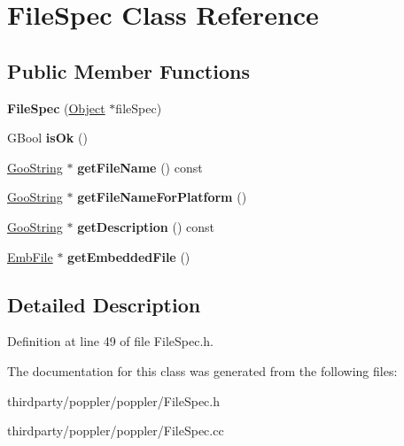 \hypertarget{class_file_spec}{}\section{File\+Spec Class Reference}
\label{class_file_spec}
\subsection*{Public Member Functions}
\begin{DoxyCompactItemize}
\item 
\mbox{\label{class_file_spec_a2db014d6e042bdb6a4bd608b4624f016}} 
{\bfseries File\+Spec} (\hyperlink{class_object}{Object} $\ast$file\+Spec)
\item 
\mbox{\label{class_file_spec_aed97b44f1a9583533e6afcc7f3b10735}} 
G\+Bool {\bfseries is\+Ok} ()
\item 
\mbox{\label{class_file_spec_aa2772556d1dfbbb8bca3e2717f1a026a}} 
\hyperlink{class_goo_string}{Goo\+String} $\ast$ {\bfseries get\+File\+Name} () const
\item 
\mbox{\label{class_file_spec_a4649602d28297d032b3c68426570f59f}} 
\hyperlink{class_goo_string}{Goo\+String} $\ast$ {\bfseries get\+File\+Name\+For\+Platform} ()
\item 
\mbox{\label{class_file_spec_a7a229786f5a669b2eb37515de44637be}} 
\hyperlink{class_goo_string}{Goo\+String} $\ast$ {\bfseries get\+Description} () const
\item 
\mbox{\label{class_file_spec_abf788a2f6459d87ba2ea74bad5ed3651}} 
\hyperlink{class_emb_file}{Emb\+File} $\ast$ {\bfseries get\+Embedded\+File} ()
\end{DoxyCompactItemize}


\subsection{Detailed Description}


Definition at line 49 of file File\+Spec.\+h.



The documentation for this class was generated from the following files\+:\begin{DoxyCompactItemize}
\item 
thirdparty/poppler/poppler/File\+Spec.\+h\item 
thirdparty/poppler/poppler/File\+Spec.\+cc\end{DoxyCompactItemize}
